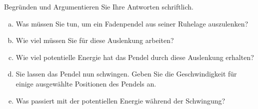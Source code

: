 
\begin{aufgabe}
	\label{pendel_energieerhaltung}
Begründen und Argumentieren Sie Ihre Antworten schriftlich.
	\begin{enumerate}[a)]
		\item	Was müssen Sie tun, um ein Fadenpendel aus seiner Ruhelage auszulenken?
		\item Wie viel müssen Sie für diese Auslenkung arbeiten?
		\item Wie viel potentielle Energie hat das Pendel durch diese Auslenkung erhalten?

		\item Sie lassen das Pendel nun schwingen. Geben Sie die Geschwindigkeit für einige ausgewählte Positionen des Pendels an.
		\item Was passiert mit der potentiellen Energie während der Schwingung?

	\end{enumerate}
\end{aufgabe}

